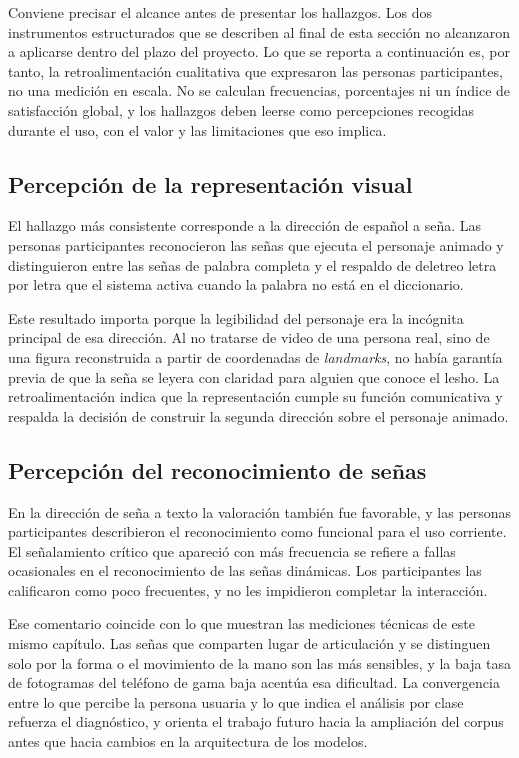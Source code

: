 Conviene precisar el alcance antes de presentar los hallazgos. Los dos instrumentos estructurados que se describen al final de esta sección no alcanzaron a aplicarse dentro del plazo del proyecto. Lo que se reporta a continuación es, por tanto, la retroalimentación cualitativa que expresaron las personas participantes, no una medición en escala. No se calculan frecuencias, porcentajes ni un índice de satisfacción global, y los hallazgos deben leerse como percepciones recogidas durante el uso, con el valor y las limitaciones que eso implica.

\subsection{Percepción de la representación visual}

El hallazgo más consistente corresponde a la dirección de español a seña. Las personas participantes reconocieron las señas que ejecuta el personaje animado y distinguieron entre las señas de palabra completa y el respaldo de deletreo letra por letra que el sistema activa cuando la palabra no está en el diccionario.

Este resultado importa porque la legibilidad del personaje era la incógnita principal de esa dirección. Al no tratarse de video de una persona real, sino de una figura reconstruida a partir de coordenadas de \textit{landmarks}, no había garantía previa de que la seña se leyera con claridad para alguien que conoce el \Acrshort{lesho}. La retroalimentación indica que la representación cumple su función comunicativa y respalda la decisión de construir la segunda dirección sobre el personaje animado.

\subsection{Percepción del reconocimiento de señas}

En la dirección de seña a texto la valoración también fue favorable, y las personas participantes describieron el reconocimiento como funcional para el uso corriente. El señalamiento crítico que apareció con más frecuencia se refiere a fallas ocasionales en el reconocimiento de las señas dinámicas. Los participantes las calificaron como poco frecuentes, y no les impidieron completar la interacción.

Ese comentario coincide con lo que muestran las mediciones técnicas de este mismo capítulo. Las señas que comparten lugar de articulación y se distinguen solo por la forma o el movimiento de la mano son las más sensibles, y la baja tasa de fotogramas del teléfono de gama baja acentúa esa dificultad. La convergencia entre lo que percibe la persona usuaria y lo que indica el análisis por clase refuerza el diagnóstico, y orienta el trabajo futuro hacia la ampliación del corpus antes que hacia cambios en la arquitectura de los modelos.

